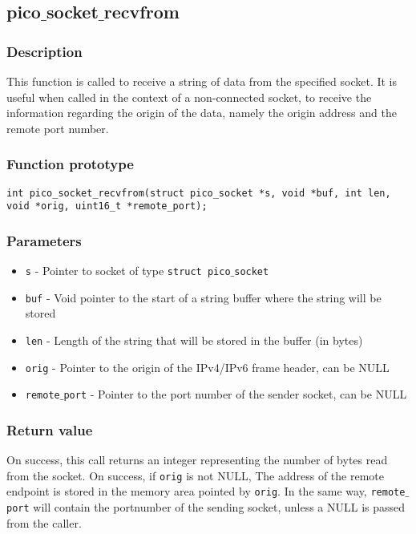 \subsection{pico$\_$socket$\_$recvfrom}

\subsubsection*{Description}
This function is called to receive a string of data from the specified socket.
It is useful when called in the context of a non-connected socket, to receive
the information regarding the origin of the data, namely the origin address and 
the remote port number.

\subsubsection*{Function prototype}
\begin{verbatim}
int pico_socket_recvfrom(struct pico_socket *s, void *buf, int len,
void *orig, uint16_t *remote_port);
\end{verbatim}

\subsubsection*{Parameters}
\begin{itemize}[noitemsep]
\item \texttt{s} - Pointer to socket of type \texttt{struct pico$\_$socket}
\item \texttt{buf} - Void pointer to the start of a string buffer where the string will be stored
\item \texttt{len} - Length of the string that will be stored in the buffer (in bytes)
\item \texttt{orig} - Pointer to the origin of the IPv4/IPv6 frame header, can be NULL
\item \texttt{remote$\_$port} - Pointer to the port number of the sender socket, can be NULL
\end{itemize}

\subsubsection*{Return value}
On success, this call returns an integer representing the number of bytes read from the socket. On success, if \texttt{orig}
is not NULL, The address of the remote endpoint is stored in the memory area pointed by \texttt{orig}. 
In the same way, \texttt{remote$\_$port} will contain the portnumber of the sending socket, unless a NULL is passed
from the caller.

